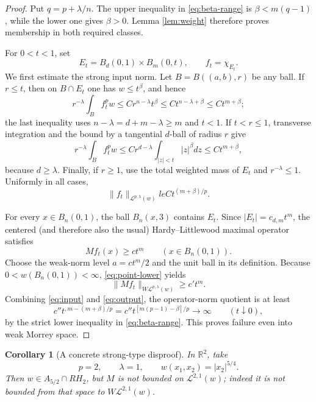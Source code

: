 \documentclass[10pt]{article}
\newtheorem{corollary}[theorem]{Corollary}
\newcommand{\R}{\mathbb R}
\newcommand{\Mor}{\mathcal L}
\newcommand{\WMor}{W\mathcal L}
\begin{document}
\begin{proof}
Put $q=p+\lambda/n$.  The upper inequality in \eqref{eq:beta-range} is
$\beta<m(q-1)$, while the lower one gives $\beta>0$.  Lemma
\ref{lem:weight} therefore proves membership in both required classes.

For $0<t<1$, set
\[
 E_t=B_d(0,1)\times B_m(0,t),\qquad f_t=\chi_{E_t}.
\]
We first estimate the strong input norm.  Let $B=B((a,b),r)$ be any ball.
If $r\le t$, then on $B\cap E_t$ one has $w\le t^\beta$, and hence
\[
 r^{-\lambda}\int_B f_t^p w
 \le C r^{n-\lambda}t^\beta
 \le C t^{n-\lambda+\beta}
 \le C t^{m+\beta};
\]
the last inequality uses $n-\lambda=d+m-\lambda\ge m$ and $t<1$.
If $t<r\le1$, transverse integration and the bound by a tangential
$d$-ball of radius $r$ give
\[
 r^{-\lambda}\int_B f_t^p w
 \le C r^{d-\lambda}\int_{|z|<t}|z|^\beta dz
 \le C t^{m+\beta},
\]
because $d\ge\lambda$.  Finally, if $r\ge1$, use the total weighted mass
of $E_t$ and $r^{-\lambda}\le1$.  Uniformly in all cases,
\begin{equation}\label{eq:input}
 \|f_t\|_{\Mor^{p,\lambda}(w)}le C t^{(m+\beta)/p}.
\end{equation}

For every $x\in B_n(0,1)$, the ball $B_n(x,3)$ contains $E_t$.  Since
$|E_t|=c_{d,m}t^m$, the centered (and therefore also the usual)
Hardy--Littlewood maximal operator satisfies
\begin{equation}\label{eq:point-lower}
 Mf_t(x)\ge c t^m\qquad (x\in B_n(0,1)).
\end{equation}
Choose the weak-norm level $a=ct^m/2$ and the unit ball in its definition.
Because $0<w(B_n(0,1))<\infty$, \eqref{eq:point-lower} yields
\begin{equation}\label{eq:output}
 \|Mf_t\|_{\WMor^{p,\lambda}(w)}\ge c' t^m.
\end{equation}
Combining \eqref{eq:input} and \eqref{eq:output}, the operator-norm quotient
is at least
\[
 c''t^{,m-(m+\beta)/p}
 =c''t^{[m(p-1)-\beta]/p}\longrightarrow\infty
 \qquad(t\downarrow0),
\]
by the strict lower inequality in \eqref{eq:beta-range}.  This proves failure
even into weak Morrey space.
\end{proof}

\begin{corollary}[A concrete strong-type disproof]\label{cor:explicit}
In $\R^2$, take
\[
 p=2,\qquad\lambda=1,\qquad
 w(x_1,x_2)=|x_2|^{5/4}.
\]
Then $w\in A_{5/2}\cap RH_2$, but $M$ is not bounded on
$\Mor^{2,1}(w)$; indeed it is not bounded from that space to
$\WMor^{2,1}(w)$.
\end{corollary}
\end{document}
